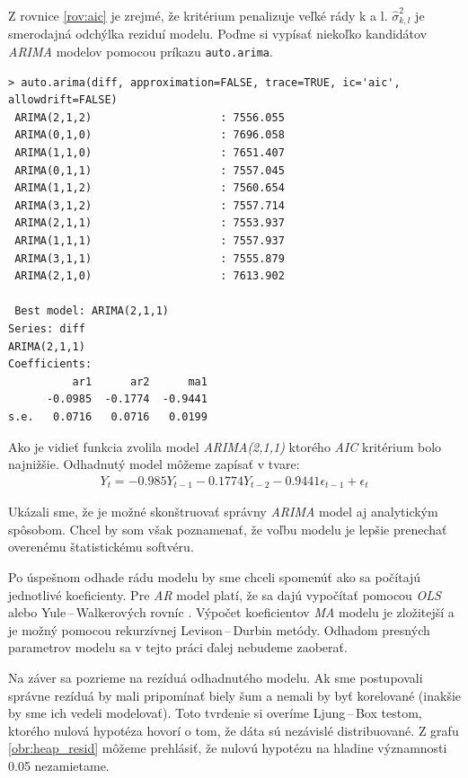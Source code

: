 \documentclass[12pt,a4paper,oneside,final]{article}
\theoremstyle{definition}
\theoremstyle{remark}
\numberwithin{equation}{section}
\begin{document}
Z rovnice \ref{rov:aic} je zrejmé, že kritérium penalizuje veľké rády k a l. 
$\hat{\sigma}^{2}_{k,l}$ je smerodajná odchýlka reziduí modelu. 
Poďme si vypísať niekoľko kandidátov \emph{ARIMA} modelov pomocou príkazu
\texttt{auto.arima}.

\begin{minipage}{\linewidth}
\begingroup
\fontsize{9pt}{7pt}\selectfont %
\begin{verbatim}
> auto.arima(diff, approximation=FALSE, trace=TRUE, ic='aic', allowdrift=FALSE)
 ARIMA(2,1,2)                    : 7556.055
 ARIMA(0,1,0)                    : 7696.058
 ARIMA(1,1,0)                    : 7651.407
 ARIMA(0,1,1)                    : 7557.045
 ARIMA(1,1,2)                    : 7560.654
 ARIMA(3,1,2)                    : 7557.714
 ARIMA(2,1,1)                    : 7553.937
 ARIMA(1,1,1)                    : 7557.937
 ARIMA(3,1,1)                    : 7555.879
 ARIMA(2,1,0)                    : 7613.902

 Best model: ARIMA(2,1,1)                    
Series: diff 
ARIMA(2,1,1)                    
Coefficients:
          ar1      ar2      ma1
      -0.0985  -0.1774  -0.9441
s.e.   0.0716   0.0716   0.0199
\end{verbatim}
\endgroup
\end{minipage}

Ako je vidieť funkcia zvolila model \emph{ARIMA(2,1,1)} ktorého \emph{AIC} kritérium bolo najnižšie.
Odhadnutý model môžeme zapísať v tvare:
\begin{eqnarray} \label{rov:arima_model}
    Y_t = -0.985 Y_{t-1} - 0.1774 Y_{t-2} -0.9441\epsilon_{t-1} + \epsilon_{t}
\end{eqnarray}

Ukázali sme, že je možné skonštruovať správny \emph{ARIMA} model aj analytickým spôsobom. 
Chcel by som však poznamenať, že voľbu modelu je lepšie prenechať overenému 
štatistickému softvéru. 

Po úspešnom odhade rádu modelu by sme chceli spomenúť ako sa počítajú jednotlivé
koeficienty. Pre \emph{AR} model platí, že sa dajú vypočítať pomocou \emph{OLS} alebo Yule\,--\,Walkerových
rovníc \cite{brockwell_ts}. Výpočet koeficientov \emph{MA} modelu je zložitejší a 
je možný pomocou rekurzívnej Levison\,--\,Durbin metódy.
Odhadom presných parametrov modelu sa v tejto práci ďalej nebudeme zaoberať.  

Na záver sa pozrieme na rezíduá odhadnutého modelu. Ak sme postupovali správne rezíduá by
mali pripomínať biely šum a nemali by byť korelované (inakšie by sme ich
vedeli modelovať). Toto tvrdenie si overíme Ljung\,--\,Box testom, ktorého nulová hypotéza
hovorí o tom, že dáta sú nezávislé distribuované. Z grafu \ref{obr:heap_resid} môžeme
prehlásiť, že nulovú hypotézu na hladine významnosti 0.05 nezamietame.
\end{document}
